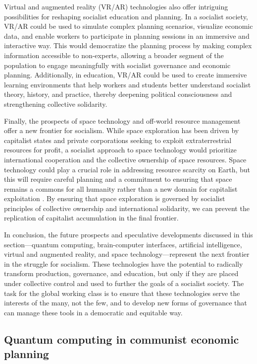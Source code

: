 \begin{refsection}
Virtual and augmented reality (VR/AR) technologies also offer intriguing possibilities for reshaping socialist education and planning. In a socialist society, VR/AR could be used to simulate complex planning scenarios, visualize economic data, and enable workers to participate in planning sessions in an immersive and interactive way. This would democratize the planning process by making complex information accessible to non-experts, allowing a broader segment of the population to engage meaningfully with socialist governance and economic planning. Additionally, in education, VR/AR could be used to create immersive learning environments that help workers and students better understand socialist theory, history, and practice, thereby deepening political consciousness and strengthening collective solidarity.

Finally, the prospects of space technology and off-world resource management offer a new frontier for socialism. While space exploration has been driven by capitalist states and private corporations seeking to exploit extraterrestrial resources for profit, a socialist approach to space technology would prioritize international cooperation and the collective ownership of space resources. Space technology could play a crucial role in addressing resource scarcity on Earth, but this will require careful planning and a commitment to ensuring that space remains a commons for all humanity rather than a new domain for capitalist exploitation \cite[pp.~215-220]{klein_space_capitalism}. By ensuring that space exploration is governed by socialist principles of collective ownership and international solidarity, we can prevent the replication of capitalist accumulation in the final frontier.

In conclusion, the future prospects and speculative developments discussed in this section—quantum computing, brain-computer interfaces, artificial intelligence, virtual and augmented reality, and space technology—represent the next frontier in the struggle for socialism. These technologies have the potential to radically transform production, governance, and education, but only if they are placed under collective control and used to further the goals of a socialist society. The task for the global working class is to ensure that these technologies serve the interests of the many, not the few, and to develop new forms of governance that can manage these tools in a democratic and equitable way.

\subsection{Quantum computing in communist economic planning}


\end{refsection}
